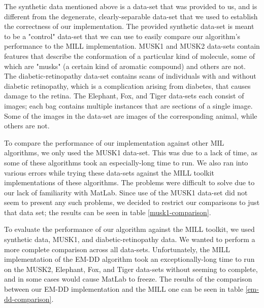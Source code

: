 \documentclass[conference]{IEEEtran}
\begin{document}
The synthetic data mentioned above is a data-set that was provided to us, and is different from the degenerate, clearly-separable data-set that we used to establish the correctness of our implementation. The provided synthetic data-set is meant to be a "control" data-set that we can use to easily compare our algorithm's performance to the MILL implementation. MUSK1 and MUSK2 data-sets contain features that describe the conformation of a particular kind of molecule, some of which are "musks" (a certain kind of aromatic compound) and others are not. The diabetic-retinopathy data-set contains scans of individuals with and without diabetic retinopathy, which is a complication arising from diabetes, that causes damage to the retina. The Elephant, Fox, and Tiger data-sets each consist of images; each bag contains multiple instances that are sections of a single image. Some of the images in the data-set are images of the corresponding animal, while others are not. 

To compare the performance of our implementation against other MIL algorithms, we only used the MUSK1 data-set. This was due to a lack of time, as some of these algorithms took an especially-long time to run. We also ran into various errors while trying these data-sets against the MILL toolkit implementations of these algorithms. The problems were difficult to solve due to our lack of familiarity with MatLab. Since use of the MUSK1 data-set did not seem to present any such problems, we decided to restrict our comparisons to just that data set; the results can be seen in table \ref{musk1-comparison}.


To evaluate the performance of our algorithm against the MILL toolkit, we used synthetic data, MUSK1, and diabetic-retinopathy data. We wanted to perform a more complete comparison across all data-sets. Unfortunately, the MILL implementation of the EM-DD algorithm took an exceptionally-long time to run on the MUSK2, Elephant, Fox, and Tiger data-sets without seeming to complete, and in some cases would cause MatLab to freeze. The results of the comparison between our EM-DD implementation and the MILL one can be seen in table \ref{em-dd-comparison}.
\end{document}
